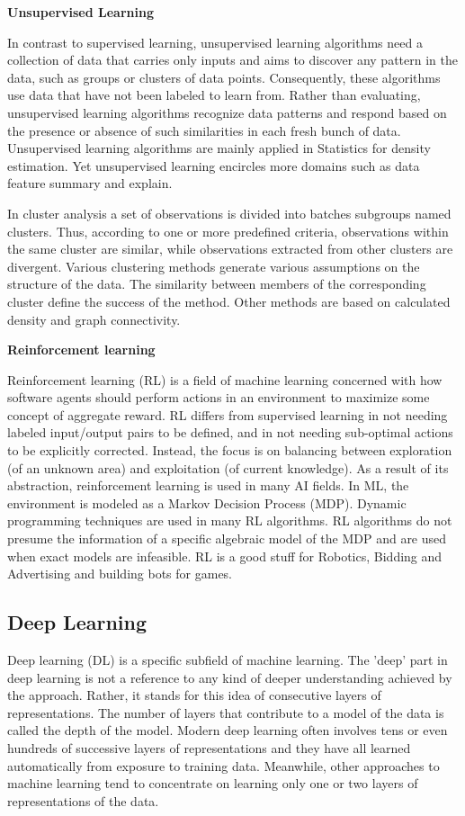 {\large \textbf{Unsupervised Learning}}

In contrast to supervised learning, unsupervised learning algorithms need a collection of data that carries only inputs and aims to discover any pattern in the data, such as groups or clusters of data points.
Consequently, these algorithms use data that have not been labeled to learn from.
Rather than evaluating, unsupervised learning algorithms recognize data patterns and respond
based on the presence or absence of such similarities in each fresh bunch of data.
Unsupervised learning algorithms are mainly applied in Statistics for density estimation.
Yet unsupervised learning encircles more domains such as data feature summary and explain.

In cluster analysis a set of observations is divided into batches subgroups named clusters.
Thus, according to one or more predefined criteria, observations within the same cluster are similar,
while observations extracted from other clusters are divergent.
Various clustering methods generate various assumptions on the structure of the data.
The similarity between members of the corresponding cluster define the success of the method.
Other methods are based on calculated density and graph connectivity.

{\large \textbf{Reinforcement learning}}

Reinforcement learning (RL) is a field of machine learning concerned with how software agents should perform
actions in an environment to maximize some concept of aggregate reward.
RL differs from supervised learning in not needing labeled input/output pairs to be defined,
and in not needing sub-optimal actions to be explicitly corrected.
Instead, the focus is on balancing between exploration (of an unknown area) and exploitation (of current knowledge).
As a result of its abstraction, reinforcement learning is used in many AI fields.
In ML, the environment is modeled as a Markov Decision Process (MDP).
Dynamic programming techniques are used in many RL algorithms.
RL algorithms do not presume the information of a specific algebraic model of the MDP and are used when exact models are infeasible.
RL is a good stuff for Robotics, Bidding and Advertising and building bots for games.

\subsection{Deep Learning}\label{subsec:deep-learning}

Deep learning (DL) is a specific subfield of machine learning.
The 'deep' part in deep learning is not a reference to any kind of deeper understanding achieved by the approach.
Rather, it stands for this idea of consecutive layers of representations.
The number of layers that contribute to a model of the data is called the depth of the model.
Modern deep learning often involves tens or even hundreds of successive layers of representations and they
have all learned automatically from exposure to training data.
Meanwhile, other approaches to machine learning tend to concentrate on learning only one or two layers of
representations of the data.

